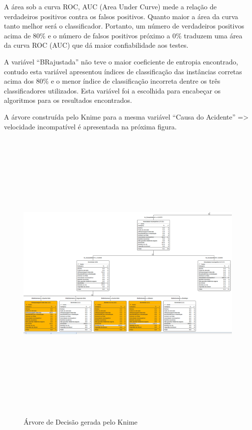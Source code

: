 A área sob a curva ROC, AUC (Area Under Curve) mede a
relação de verdadeiros positivos contra os falsos positivos.
Quanto maior a área da curva tanto melhor será o
classificador. Portanto, um número de verdadeiros positivos
acima de 80\% e o número de falsos positivos próximo a 0\%
traduzem uma área da curva ROC (AUC) que dá maior confiabilidade
aos testes.

A variável “BRajustada” não teve o maior coeficiente de
entropia encontrado, contudo esta variável apresentou
índices de classificação das instâncias corretas acima dos 80\% e
o menor índice de classificação incorreta dentre os três
classificadores utilizados. Esta variável foi a escolhida para
encabeçar os algoritmos para os resultados encontrados. 

\pagebreak

A árvore construída pelo Knime para a mesma variável “Causa do Acidente” => velocidade incompatível é apresentada na
próxima figura.

\begin{figure}[!ht]
\centering
\caption{Árvore de Decisão gerada pelo Knime}
\includegraphics[width=150mm, height=145mm]{Figuras/Metodologia/arvoreKnime.png}
\label{fig:arvoreKnime}
\end{figure}

